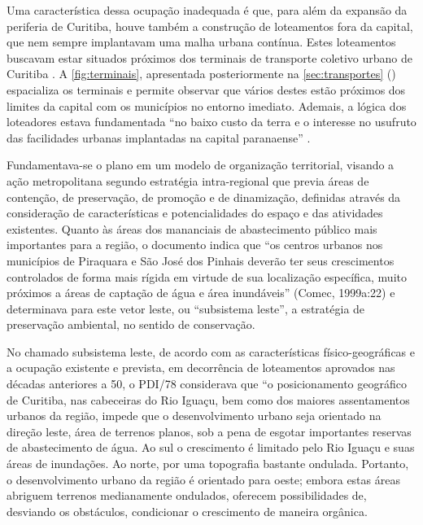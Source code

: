 	Uma característica dessa ocupação inadequada é que, para além da expansão da periferia de Curitiba, houve também a construção de loteamentos fora da capital, que nem sempre implantavam uma malha urbana contínua. Estes loteamentos buscavam estar situados próximos dos terminais de transporte coletivo urbano de Curitiba \cite[p. 138]{lima2001a}. A \autoref{fig:terminais}, apresentada posteriormente na \autoref{sec:transportes} () espacializa os terminais e permite observar que vários destes estão próximos dos limites da capital com os municípios no entorno imediato. Ademais, a lógica dos loteadores estava fundamentada ``no baixo custo da terra e o interesse no usufruto das facilidades urbanas implantadas na capital paranaense'' \cite[p. 138]{lima2001a}.
	
	
	
	Fundamentava-se o plano em um modelo de organização territorial, visando a ação metropolitana segundo estratégia intra-regional que previa áreas de contenção, de preservação, de promoção e de dinamização, definidas através da consideração de características e potencialidades do espaço e das atividades existentes. Quanto às áreas dos mananciais de abastecimento público mais importantes para a região, o documento indica que “os centros urbanos nos municípios de Piraquara e São José dos Pinhais deverão ter seus crescimentos controlados de forma mais rígida em virtude de sua localização específica, muito próximos a áreas de captação de água e área inundáveis” (Comec, 1999a:22) e determinava para este vetor leste, ou “subsistema leste”, a estratégia de preservação ambiental, no sentido de conservação. 
	
	No chamado subsistema leste, de acordo com as características físico-geográficas e a ocupação existente e prevista, em decorrência de loteamentos aprovados nas décadas anteriores a 50, o PDI/78 considerava que “o posicionamento geográfico de Curitiba, nas cabeceiras do Rio Iguaçu, bem como dos maiores assentamentos urbanos da região, impede que o desenvolvimento urbano seja orientado na direção leste, área de terrenos planos, sob a pena de esgotar importantes reservas de abastecimento de água. Ao sul o crescimento é limitado pelo Rio Iguaçu e suas áreas de inundações. Ao norte, por uma topografia bastante ondulada. Portanto, o desenvolvimento urbano da região é orientado para oeste; embora estas áreas abriguem terrenos medianamente ondulados, oferecem possibilidades de, desviando os obstáculos, condicionar o crescimento de maneira orgânica.
	
